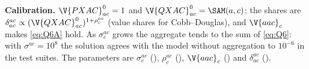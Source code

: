 \textbf{Calibration.} $\V{PXAC}^0_{ac} = 1$ and $\V{QXAC}^0_{ac} = \SAM(a, c)$;
the shares are $\delta^{ac}_{ac} \propto (\V{QXAC}^0_{ac})^{1 + \rho^{ac}_c}$
(value shares for Cobb--Douglas), and $\V{aac}_c$ makes \eqref{eq:Q6A} hold. As
$\sigma^{ac}_c$ grows the aggregate tends to the sum of \eqref{eq:Q6}: with
$\sigma^{ac} = 10^8$ the solution agrees with the model without aggregation to
$10^{-6}$ in the test suites. The parameters are $\sigma^{ac}_c$ (),
$\rho^{ac}_c$ (), $\V{aac}_c$ () and $\delta^{ac}_{ac}$
().
